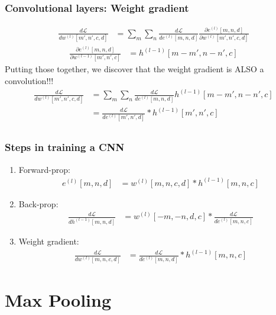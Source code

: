 \documentclass{beamer}
\begin{document}
\begin{frame}
  \frametitle{Convolutional layers: Weight gradient}

  \begin{align*}
    \frac{d{\mathcal L}}{dw^{(l)}[m',n',c,d]} &=
    \sum_{m}\sum_n\frac{d{\mathcal L}}{de^{(l)}[m,n,d]}
    \frac{\partial e^{(l)}[m,n,d]}{\partial w^{(l)}[m',n',c,d]}
  \end{align*}
  \begin{align*}
    \frac{\partial e^{(l)}[m,n,d]}{\partial w^{(l-1)}[m',n',c]} &= h^{(l-1)}[m-m',n-n',c]
  \end{align*}
  Putting those together, we discover that the weight gradient is ALSO a convolution!!!
  \begin{align*}
    \frac{d{\mathcal L}}{dw^{(l)}[m',n',c,d]} &=
    \sum_{m}\sum_n \frac{d{\mathcal L}}{de^{(l)}[m,n,d]}h^{(l-1)}[m-m',n-n',c]\\
    &= \frac{d{\mathcal L}}{de^{(l)}[m',n',d]} \ast h^{(l-1)}[m',n',c]\\
  \end{align*}
\end{frame}

\begin{frame}
  \frametitle{Steps in training a CNN}
  \begin{enumerate}
  \item Forward-prop:
    \begin{align*}
      e^{(l)}[m,n,d] &= w^{(l)}[m,n,c,d] \ast h^{(l-1)}[m,n,c]
    \end{align*}
  \item Back-prop:
    \begin{align*}
      \frac{d{\mathcal L}}{dh^{(l-1)}[m,n,d]} &=
      w^{(l)}[-m,-n,d,c] \ast \frac{d{\mathcal L}}{de^{(l)}[m,n,c]}
    \end{align*}
  \item Weight gradient:
    \begin{align*}
      \frac{d{\mathcal L}}{dw^{(l)}[m,n,c,d]} &=
      \frac{d{\mathcal L}}{de^{(l)}[m,n,d]} \ast h^{(l-1)}[m,n,c]
    \end{align*}
  \end{enumerate}
\end{frame}

\section{Max Pooling}
\setcounter{subsection}{1}
\end{document}
